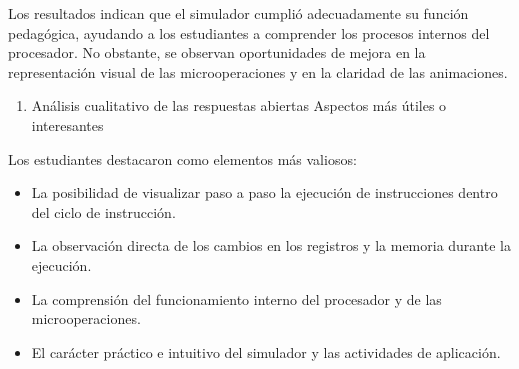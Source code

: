 \documentclass[12pt,oneside]{templates/unerthesis}
\providecommand{\tightlist}{%
  \setlength{\itemsep}{0pt}\setlength{\parskip}{0pt}}
\begin{document}
\begin{table}[!h]
\centering
\caption{\label{tab:tablaevaluacion}Evaluación de aspectos clave del simulador VonSim8}
\centering
{}
\end{table}

Los resultados indican que el simulador cumplió adecuadamente su función pedagógica, ayudando a los estudiantes a comprender los procesos internos del procesador. No obstante, se observan oportunidades de mejora en la representación visual de las microoperaciones y en la claridad de las animaciones.

\begin{enumerate}
\def\labelenumi{\arabic{enumi}.}
\setcounter{enumi}{3}
\tightlist
\item
  Análisis cualitativo de las respuestas abiertas
  Aspectos más útiles o interesantes
\end{enumerate}

Los estudiantes destacaron como elementos más valiosos:

\begin{itemize}
\item
  La posibilidad de visualizar paso a paso la ejecución de instrucciones dentro del ciclo de instrucción.
\item
  La observación directa de los cambios en los registros y la memoria durante la ejecución.
\item
  La comprensión del funcionamiento interno del procesador y de las microoperaciones.
\item
  El carácter práctico e intuitivo del simulador y las actividades de aplicación.
\end{itemize}
\end{document}
